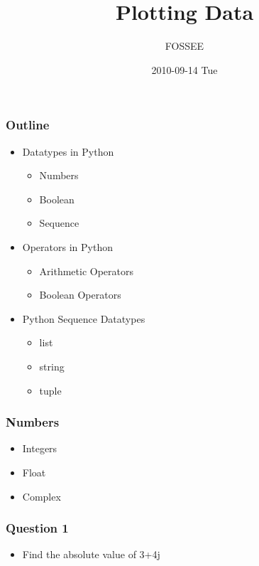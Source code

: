\documentclass[presentation]{beamer}
\title{Plotting Data }
\author{FOSSEE}
\date{2010-09-14 Tue}
\begin{document}
\maketitle










\begin{frame}
\frametitle{Outline}
\label{sec-1}
\begin{itemize}

\item Datatypes in Python
\label{sec-1_1}%
\begin{itemize}
\item Numbers
\item Boolean
\item Sequence
\end{itemize}


\item Operators in Python
\label{sec-1_2}%
\begin{itemize}
\item Arithmetic Operators
\item Boolean Operators
\end{itemize}


\item Python Sequence Datatypes
\label{sec-1_3}%
\begin{itemize}
\item list
\item string
\item tuple
\end{itemize}


\end{itemize} %
\end{frame}
\begin{frame}
\frametitle{Numbers}
\label{sec-2}

\begin{itemize}
\item Integers
\item Float
\item Complex
\end{itemize}
\end{frame}
\begin{frame}
\frametitle{Question 1}
\label{sec-3}

\begin{itemize}
\item Find the absolute value of 3+4j
\end{itemize}
\end{frame}
\end{document}
